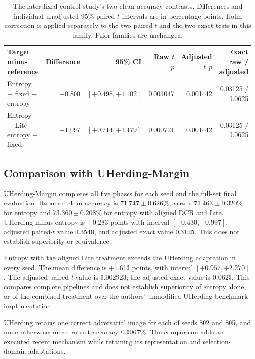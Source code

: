 \documentclass[a4paper,fleqn]{cas-dc}
\let\CAENLcaption\caption
\let\caption\CAENLcaption
\begin{document}
\begin{table}[pos=tbp]
\caption{The later fixed-control study's two clean-accuracy contrasts.
Differences and individual unadjusted 95\% paired-$t$ intervals are in
percentage points. Holm correction is applied separately to the two
paired-$t$ and the two exact tests in this family. Prior families are unchanged.}
\label{tab:entropy_fixed_tests}
\centering\small
\begin{tabularx}{\textwidth}{@{}Yrrrrr@{}}
\toprule
Target minus reference & Difference & 95\% CI & Raw $t$ $p$ &
Adjusted $t$ $p$ & Exact raw / adjusted \\
\midrule
Entropy + fixed $-$ entropy & +0.800 & $[+0.498,+1.102]$ &
0.001047 & 0.001442 & 0.03125 / 0.0625 \\
Entropy + Lite $-$ entropy + fixed & +1.097 & $[+0.714,+1.479]$ &
0.000721 & 0.001442 & 0.03125 / 0.0625 \\
\bottomrule
\end{tabularx}
\end{table}


\subsection{Comparison with UHerding-Margin}
\label{sec:uherding_results}

UHerding-Margin completes all five phases for each seed
and the full-set final evaluation.
Its mean clean accuracy is $71.747\pm0.626\%$,
versus $71.463\pm0.320\%$ for entropy and
$73.360\pm0.208\%$ for entropy with aligned DCR and Lite.
UHerding minus entropy is +0.283 points with
interval $[-0.430,+0.997]$, adjusted paired-$t$ value
0.3540, and adjusted exact value 0.3125.
This does not establish superiority or equivalence.

Entropy with the aligned Lite treatment exceeds the UHerding
adaptation in every seed. The mean difference is +1.613 points,
with interval $[+0.957,+2.270]$.
The adjusted paired-$t$ value is 0.002923;
the adjusted exact value is 0.0625.
This compares complete pipelines and does not establish
superiority of entropy alone, or of the combined treatment
over the authors' unmodified UHerding benchmark implementation.


UHerding retains one correct adversarial image for each of
seeds 802 and 805, and none otherwise:
mean robust accuracy $0.0067\%$.
The comparison adds an executed recent mechanism while retaining
its representation and selection-domain adaptations.
\end{document}
